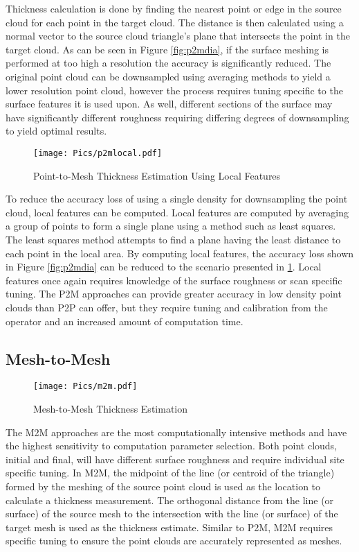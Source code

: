 Thickness calculation is done by finding the nearest point or edge in the source cloud for each point in the target cloud. The distance is then calculated using a normal vector to the source cloud triangle's plane that intersects the point in the target cloud. As can be seen in Figure \ref{fig:p2mdia}, if the surface meshing is performed at too high a resolution the accuracy is significantly reduced. The original point cloud can be downsampled using averaging methods to yield a lower resolution point cloud, however the process requires tuning specific to the surface features it is used upon. As well, different sections of the surface may have significantly different roughness requiring differing degrees of downsampling to yield optimal results.\\
\begin{figure}[h!]
    \centering
    \texttt{[image: Pics/p2mlocal.pdf]}
    \caption{Point-to-Mesh Thickness Estimation Using Local Features}
    \label{fig:p2mlocaldia}
\end{figure}

To reduce the accuracy loss of using a single density for downsampling the point cloud, local features can be computed. Local features are computed by averaging a group of points to form a single plane using a method such as least squares. The least squares method attempts to find a plane having the least distance to each point in the local area. By computing local features, the accuracy loss shown in Figure \ref{fig:p2mdia} can be reduced to the scenario presented in \ref{fig:p2mlocaldia}. Local features once again requires knowledge of the surface roughness or scan specific tuning. The P2M approaches can provide greater accuracy in low density point clouds than P2P can offer, but they require tuning and calibration from the operator and an increased amount of computation time.\\
\subsection{Mesh-to-Mesh}
\begin{figure}[h!]
    \centering
    \texttt{[image: Pics/m2m.pdf]}
    \caption{Mesh-to-Mesh Thickness Estimation}
    \label{fig:m2mdia}
\end{figure}
The M2M approaches are the most computationally intensive methods and have the highest sensitivity to computation parameter selection. Both point clouds, initial and final, will have different surface roughness and require individual site specific tuning. In M2M, the midpoint of the line (or centroid of the triangle) formed by the meshing of the source point cloud is used as the location to calculate a thickness measurement. The orthogonal distance from the line (or surface) of the source mesh to the intersection with the line (or surface) of the target mesh is used as the thickness estimate. Similar to P2M, M2M requires specific tuning to ensure the point clouds are accurately represented as meshes.\\

